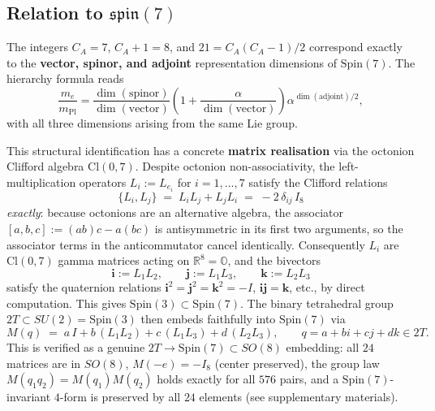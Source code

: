 \documentclass[11pt]{article}
\newcommand{\CA}{C_A}
\begin{document}
\subsection{Relation to $\mathfrak{spin}(7)$}

The integers $\CA = 7$, $\CA + 1 = 8$, and $21 = \CA(\CA-1)/2$
correspond exactly to the \textbf{vector, spinor, and adjoint}
representation dimensions of $\mathrm{Spin}(7)$.  The hierarchy
formula reads
\begin{equation}
  \frac{m_e}{m_\text{Pl}}
  = \frac{\dim(\text{spinor})}{\dim(\text{vector})}
    \left(1 + \frac{\alpha}{\dim(\text{vector})}\right)
    \alpha^{\dim(\text{adjoint})/2},
\end{equation}
with all three dimensions arising from the same Lie group.

This structural identification has a concrete \textbf{matrix
realisation} via the octonion Clifford algebra $\mathrm{Cl}(0,7)$.
Despite octonion non-associativity, the left-multiplication
operators $L_i := L_{e_i}$ for $i = 1, \ldots, 7$ satisfy the
Clifford relations
\begin{equation}
  \{L_i, L_j\} \;=\; L_i L_j + L_j L_i \;=\; -2\,\delta_{ij}\,I_8
\end{equation}
\emph{exactly}: because octonions are an alternative algebra, the
associator $[a, b, c] := (ab)c - a(bc)$ is antisymmetric in its
first two arguments, so the associator terms in the anticommutator
cancel identically.  Consequently $L_i$ are $\mathrm{Cl}(0, 7)$
gamma matrices acting on $\mathbb{R}^8 = \mathbb{O}$, and the
bivectors
\begin{equation}
  \mathbf{i} := L_1 L_2,\qquad
  \mathbf{j} := L_1 L_3,\qquad
  \mathbf{k} := L_2 L_3
\end{equation}
satisfy the quaternion relations $\mathbf{i}^2 = \mathbf{j}^2 =
\mathbf{k}^2 = -I$, $\mathbf{i}\mathbf{j} = \mathbf{k}$, etc.,
by direct computation.  This gives $\mathrm{Spin}(3) \subset
\mathrm{Spin}(7)$.  The binary tetrahedral group $2T \subset
SU(2) = \mathrm{Spin}(3)$ then embeds faithfully into
$\mathrm{Spin}(7)$ via
\begin{equation}
  M(q) \;=\; a\, I + b\,(L_1 L_2) + c\,(L_1 L_3) + d\,(L_2 L_3),
  \qquad q = a + bi + cj + dk \in 2T.
\end{equation}
This is verified as a genuine $2T \to \mathrm{Spin}(7) \subset SO(8)$
embedding: all $24$ matrices are in $SO(8)$, $M(-e) = -I_8$ (center
preserved), the group law $M(q_1 q_2) = M(q_1) M(q_2)$ holds exactly
for all $576$ pairs, and a $\mathrm{Spin}(7)$-invariant $4$-form is
preserved by all $24$ elements (see supplementary materials).
\end{document}
